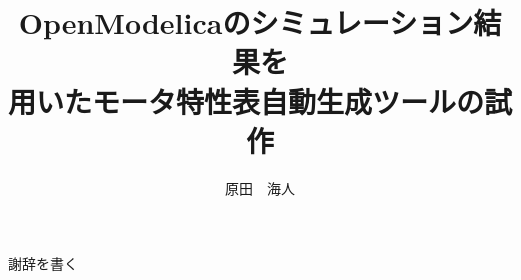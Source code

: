 \documentclass[uplatex, report, a4j, 10pt]{jsbook}
\title{OpenModelicaのシミュレーション結果を\\用いたモータ特性表自動生成ツールの試作}
\author{原田　海人}
\begin{document}
\maketitle


%
%



% 
% 




%
\acknowledgment
謝辞を書く

%




\end{document}
